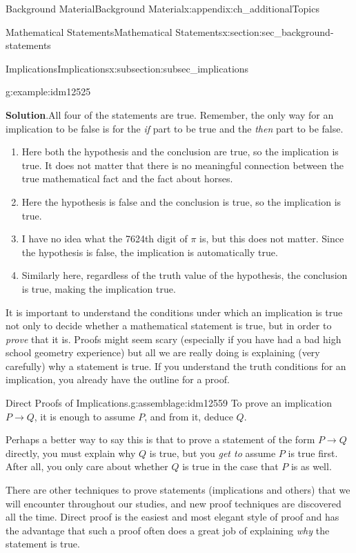 \documentclass[oneside,10pt,]{book}
\numberwithin{equation}{chapter}
\def\imp{\rightarrow}
\begin{document}
\begin{appendixptx}{Background Material}{}{Background Material}{}{}{x:appendix:ch_additionalTopics}
\begin{sectionptx}{Mathematical Statements}{}{Mathematical Statements}{}{}{x:section:sec_background-statements}
\begin{subsectionptx}{Implications}{}{Implications}{}{}{x:subsection:subsec_implications}
\begin{example}{}{g:example:idm12525}
\begin{enumerate}
\end{enumerate}
%
\par\smallskip%
\noindent\textbf{Solution}.\hypertarget{g:solution:idm12543}{}\quad{}All four of the statements are true. Remember, the only way for an implication to be false is for the \emph{if} part to be true and the \emph{then} part to be false.%
\begin{enumerate}
\item{}Here both the hypothesis and the conclusion are true, so the implication is true. It does not matter that there is no meaningful connection between the true mathematical fact and the fact about horses.%
\item{}Here the hypothesis is false and the conclusion is true, so the implication is true.%
\item{}I have no idea what the 7624th digit of \(\pi\) is, but this does not matter. Since the hypothesis is false, the implication is automatically true.%
\item{}Similarly here, regardless of the truth value of the hypothesis, the conclusion is true, making the implication true.%
\end{enumerate}
%
\end{example}
It is important to understand the conditions under which an implication is true not only to decide whether a mathematical statement is true, but in order to \emph{prove} that it is. Proofs might seem scary (especially if you have had a bad high school geometry experience) but all we are really doing is explaining (very carefully) why a statement is true. If you understand the truth conditions for an implication, you already have the outline for a proof.%
\begin{assemblage}{Direct Proofs of Implications.}{g:assemblage:idm12559}%
To prove an implication \(P \imp Q\), it is enough to assume \(P\), and from it, deduce \(Q\).%
\end{assemblage}
Perhaps a better way to say this is that to prove a statement of the form \(P \imp Q\) directly, you must explain why \(Q\) is true, but you \emph{get to} assume \(P\) is true first.  After all, you only care about whether \(Q\) is true in the case that \(P\) is as well.%
\par
There are other techniques to prove statements (implications and others) that we will encounter throughout our studies, and new proof techniques are discovered all the time. Direct proof is the easiest and most elegant style of proof and has the advantage that such a proof often does a great job of explaining \emph{why} the statement is true.%

\end{subsectionptx}
\end{sectionptx}
\end{appendixptx}
\end{document}
